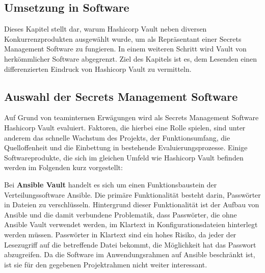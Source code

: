 \documentclass[
book,
a4paper,   
titlepage,  
halfparskip,
12pt        
]{scrartcl}
\begin{document}
\begin{onehalfspacing}
\newpage
\section{Umsetzung in Software}
\label{sec:soft}

Dieses Kapitel stellt dar, warum Hashicorp Vault neben diversen Konkurrenzprodukten ausgewählt wurde, um als Repräsentant einer Secrets Management Software zu fungieren. In einem weiteren Schritt wird Vault von herkömmlicher Software abgegrenzt. Ziel des Kapitels ist es, dem Lesenden einen differenzierten Eindruck von Hashicorp Vault zu vermitteln. 

\subsection{Auswahl der Secrets Management Software}
\label{subsec:chocho}
Auf Grund von teaminternen Erwägungen wird als Secrets Management Software Hashicorp Vault evaluiert. Faktoren, die hierbei eine Rolle spielen, sind unter anderem das schnelle Wachstum des Projekts, der Funktionsumfang, die Quelloffenheit und die Einbettung in bestehende Evaluierungsprozesse. Einige Softwareprodukte, die sich im gleichen Umfeld wie Hashicorp Vault befinden werden im Folgenden kurz vorgestellt:\cite{github}

Bei \textbf{Ansible Vault} handelt es sich um einen Funktionsbaustein der Verteilungssoftware Ansible. Die primäre Funktionalität besteht darin, Passwörter in Dateien zu verschlüsseln. Hintergrund dieser Funktionalität ist der Aufbau von Ansible und die damit verbundene Problematik, dass Passwörter, die ohne Ansible Vault verwendet werden, im Klartext in Konfigurationsdateien hinterlegt werden müssen. Passwörter in Klartext sind ein hohes Risiko, da jeder der Lesezugriff auf die betreffende Datei bekommt, die Möglichkeit hat das Passwort abzugreifen.\cite{ansible} Da die Software im Anwendungsrahmen auf Ansible beschränkt ist, ist sie für den gegebenen Projektrahmen nicht weiter interessant.


\end{onehalfspacing}
\end{document}
